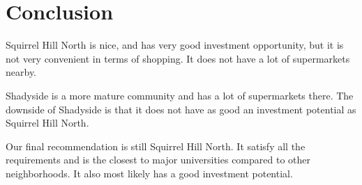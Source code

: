 \documentclass[11pt,notitlepage]{article}
\begin{document}
\section{Conclusion}
Squirrel Hill North is nice, and has very good investment opportunity,
but it is not very convenient in terms of shopping.
It does not have a lot of supermarkets nearby.

Shadyside is a more mature community and has a lot of supermarkets there.
The downside of Shadyside is that it does not have as good an
investment potential as Squirrel Hill North.

Our final recommendation is still Squirrel Hill North.
It satisfy all the requirements and is the closest to major universities
compared to other neighborhoods.
It also most likely has a good investment potential.
\end{document}
